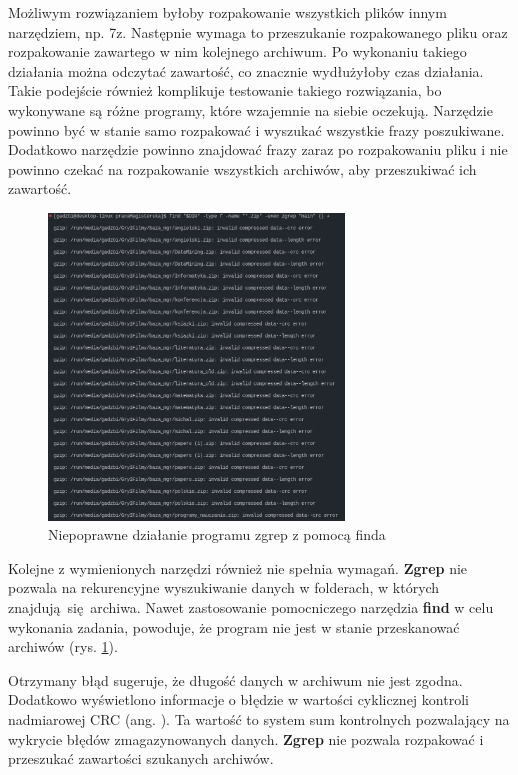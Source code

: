Możliwym rozwiązaniem byłoby rozpakowanie wszystkich plików innym narzędziem, np.
7z. Następnie wymaga to przeszukanie rozpakowanego pliku oraz rozpakowanie 
zawartego w nim kolejnego archiwum. Po wykonaniu takiego działania można 
odczytać zawartość, co znacznie wydłużyłoby czas działania. Takie podejście również
komplikuje testowanie takiego rozwiązania, bo wykonywane są różne programy, 
które wzajemnie na siebie oczekują. Narzędzie powinno być w stanie samo 
rozpakować i wyszukać wszystkie frazy poszukiwane. Dodatkowo narzędzie powinno
znajdować frazy zaraz po rozpakowaniu pliku i nie powinno czekać na rozpakowanie
wszystkich archiwów, aby przeszukiwać ich zawartość.

\begin{figure}[h]
\centering
\includegraphics[width=0.7\textwidth]{./images/zgrep-errors.png}
\caption{Niepoprawne działanie programu zgrep z pomocą finda}
\label{fig:zgrepErrors}
\end{figure}

Kolejne z wymienionych narzędzi również nie spełnia wymagań. \textbf{Zgrep} nie pozwala
na rekurencyjne wyszukiwanie danych w folderach, w których znajdują się archiwa.
Nawet zastosowanie pomocniczego narzędzia \textbf{find} w celu wykonania zadania,
powoduje, że program nie jest w stanie przeskanować archiwów (rys. \ref{fig:zgrepErrors}).

Otrzymany błąd sugeruje, że długość danych w archiwum nie jest zgodna. Dodatkowo
wyświetlono informacje o błędzie w wartości cyklicznej kontroli nadmiarowej CRC
(ang. ). Ta wartość to system sum kontrolnych
pozwalający na wykrycie błędów zmagazynowanych danych. \textbf{Zgrep} nie pozwala 
rozpakować i przeszukać zawartości szukanych archiwów.


